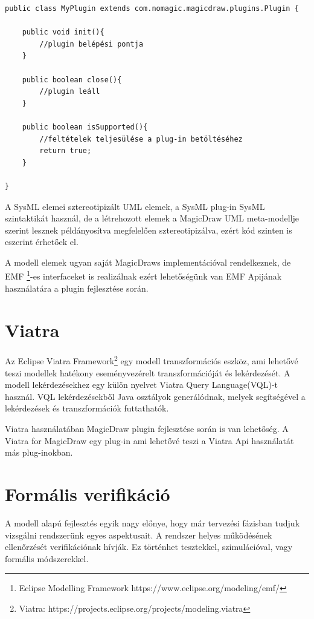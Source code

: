 \lstset{style=javacode}
\begin{lstlisting}
public class MyPlugin extends com.nomagic.magicdraw.plugins.Plugin {

	public void init(){
		//plugin belépési pontja
	}
	
	public boolean close(){
		//plugin leáll
	}
	
	public boolean isSupported(){
		//feltételek teljesülése a plug-in betöltéséhez
		return true;
	}
	
}
\end{lstlisting}

A SysML elemei sztereotipizált UML elemek, a SysML plug-in SysML szintaktikát használ, de a létrehozott elemek a MagicDraw UML meta-modellje szerint lesznek példányosítva megfelelően sztereotipizálva, ezért kód szinten is eszerint érhetőek el.

A modell elemek ugyan saját MagicDraws implementációval rendelkeznek, de EMF \footnote{Eclipse Modelling Framework https://www.eclipse.org/modeling/emf/}-es interfaceket is realizálnak ezért lehetőségünk van EMF Apijának használatára a plugin fejlesztése során.

\section{Viatra}

Az Eclipse Viatra Framework\footnote{Viatra: https://projects.eclipse.org/projects/modeling.viatra} egy modell transzformációs eszköz, ami lehetővé teszi modellek hatékony eseményvezérelt transzformációját és lekérdezését. A modell lekérdezésekhez egy külön nyelvet Viatra Query Language(VQL)-t használ. VQL lekérdezésekből Java osztályok generálódnak, melyek segítségével a lekérdezések és transzformációk futtathatók.

Viatra használatában MagicDraw plugin fejlesztése során is van lehetőség. A Viatra for MagicDraw egy plug-in ami lehetővé teszi a Viatra Api használatát más plug-inokban. 

\section{Formális verifikáció}
\label{sec:formal-verif}
A modell alapú fejlesztés egyik nagy előnye, hogy már tervezési fázisban tudjuk vizsgálni rendszerünk egyes aspektusait. A rendszer helyes működésének ellenőrzését verifikációnak hívják. Ez történhet tesztekkel, szimulációval, vagy formális módszerekkel.

